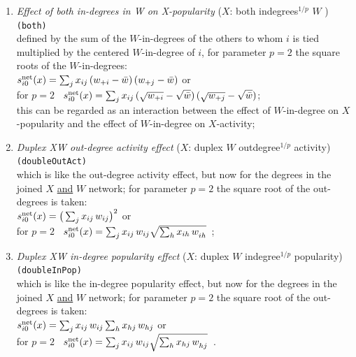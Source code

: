 \documentclass[a4paper,fleqn,11pt]{article}
\newcommand{\+}{\, + \,}
\newcommand{\vit}{\theenumi}
\newcounter{savenumi}
\begin{document}
\begin{enumerate}
 \item {\em Effect of both in-degrees in W on X-popularity } ($X$: both indegrees$^{1/p}$ $W$ ) \texttt{(both)}\\
 defined by   the sum of  the $W$-in-degrees of the others to whom $i$ is tied
 multiplied by the centered $W$-in-degree of $i$,
 for parameter $p = 2$ the square roots of the $W$-in-degrees:\\[0.2em]
 $s^{\rm net}_{i\vit}(x) =
   \sum_j x_{ij}\, ({w_{+i}} - {\bar w}) \, ({w_{+j}} - {\bar w})  $ or\\[0.2em]
for $p=2$ \  $s^{\rm net}_{i\vit}(x) =  \sum_j x_{ij}\,
 (\sqrt{w_{+i}} - \sqrt{\bar w}) \, (\sqrt{w_{+j}} - \sqrt{\bar w})  $;\\[0.2em]
 this can be regarded as an interaction between the effect of $W$-in-degree on $X$-popularity
 and the effect of $W$-in-degree on $X$-activity;

 \item {\em Duplex XW out-degree activity effect } ($X$: duplex $W$ outdegree$^{1/p}$ activity)\\
    \texttt{(doubleOutAct)}\\
  which is like the out-degree activity effect, but now for the degrees in the
  joined $X$ \underline{and} $W$ network;
 for parameter $p = 2$ the square root of the out-degrees is taken:\\[0.4em]
 $s^{\rm net}_{i\vit}(x) =  \big(\sum_j x_{ij}\,w_{ij} \big)^2  $ or\\[0.4em]
for $p=2$ \  $s^{\rm net}_{i\vit}(x) =
        \sum_j x_{ij}\,w_{ij} \sqrt{\sum_h x_{ih}\,w_{ih}^{\phantom{0}} }  $\ ;\\

 \item {\em Duplex XW in-degree popularity effect } ($X$: duplex $W$ indegree$^{1/p}$ popularity)\\
    \texttt{(doubleInPop)}\\
  which is like the in-degree popularity effect, but now for the degrees in the
  joined $X$ \underline{and} $W$ network;
 for parameter $p = 2$ the square root of the out-degrees is taken:\\[0.4em]
 $s^{\rm net}_{i\vit}(x) =  \sum_j x_{ij}\,w_{ij}\sum_h x_{hj}\,w_{hj}   $ or\\[0.4em]
for $p=2$ \  $s^{\rm net}_{i\vit}(x) =
        \sum_j x_{ij}\,w_{ij} \sqrt{\sum_h x_{hj}\,w_{hj}^{\phantom{0}} }  $\ .\\

\setcounter{savenumi}{\value{enumi}}
\end{enumerate}
\end{document}
